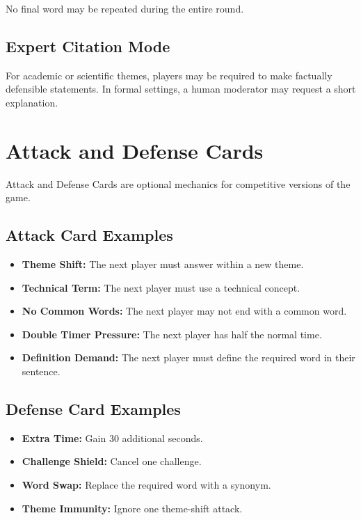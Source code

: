 \documentclass[11pt,a4paper]{article}
\begin{document}
No final word may be repeated during the entire round.

\subsection{Expert Citation Mode}

For academic or scientific themes, players may be required to make factually defensible statements. In formal settings, a human moderator may request a short explanation.

\section{Attack and Defense Cards}

Attack and Defense Cards are optional mechanics for competitive versions of the game.

\subsection{Attack Card Examples}

\begin{itemize}
    \item \textbf{Theme Shift:} The next player must answer within a new theme.
    \item \textbf{Technical Term:} The next player must use a technical concept.
    \item \textbf{No Common Words:} The next player may not end with a common word.
    \item \textbf{Double Timer Pressure:} The next player has half the normal time.
    \item \textbf{Definition Demand:} The next player must define the required word in their sentence.
\end{itemize}

\subsection{Defense Card Examples}

\begin{itemize}
    \item \textbf{Extra Time:} Gain 30 additional seconds.
    \item \textbf{Challenge Shield:} Cancel one challenge.
    \item \textbf{Word Swap:} Replace the required word with a synonym.
    \item \textbf{Theme Immunity:} Ignore one theme-shift attack.
\end{itemize}
\end{document}
